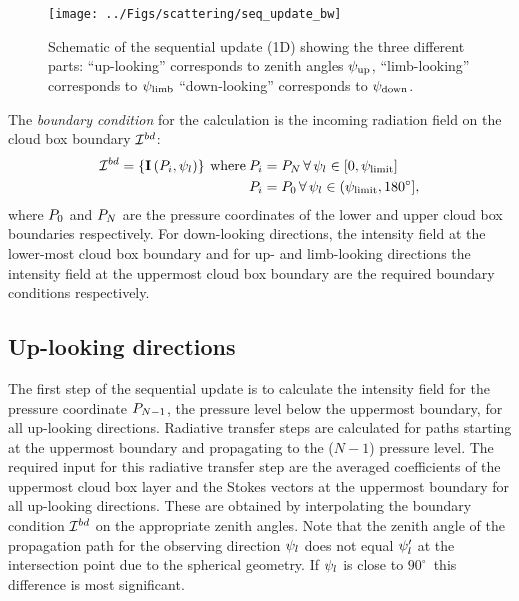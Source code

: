 \begin{figure}[htbp]
\centering
  \texttt{[image: ../Figs/scattering/seq\_update\_bw]}
 \caption{Schematic of the sequential update (1D) showing the three different parts:  ``up-looking'' corresponds to zenith angles $\psi_\mathrm{up}$, ``limb-looking'' corresponds to $\psi_\mathrm{limb}$ ``down-looking'' corresponds to $\psi_\mathrm{down}$.}
  \label{fig:scattering:seq_update}  
\end{figure}

The \emph{boundary condition} for the calculation is the incoming
radiation field on the cloud box boundary ${\mathcal I}^{bd}$:
\begin{eqnarray}
  {\mathcal I}^{bd} = \left\{{\bf I} \left( P_i,\psi_l \right) \right\}
  \: \mathrm{where}  \: & P_i = P_N \, \forall \,  \psi_l \in [0,\psi_\mathrm{limit}]  \nonumber\\
   & P_i = P_0  \, \forall \, \psi_l \in (\psi_\mathrm{limit},180^\circ],
\end{eqnarray}
where $P_0$ and $P_N$ are the pressure coordinates of the lower and
upper cloud box boundaries respectively. For down-looking directions,
the intensity field at the lower-most cloud box boundary and for up-
and limb-looking directions the intensity field at the uppermost
cloud box boundary are the required boundary conditions respectively.

\subsection{Up-looking directions}

The first step of the sequential update is to calculate the intensity
field for the pressure coordinate $P_{N-1}$, the pressure level below
the uppermost boundary, for all up-looking directions.  Radiative
transfer steps are calculated for paths starting at the uppermost
boundary and propagating to the ($N-1$) pressure level. The required
input for this radiative transfer step are the averaged coefficients
of the uppermost cloud box layer and the Stokes vectors at
the uppermost boundary for all up-looking directions. These are obtained
by interpolating the boundary condition ${\mathcal I}^{bd}$ on the
appropriate zenith angles. Note that the zenith angle of the
propagation path for the observing direction $\psi_l$ does not equal
$\psi_l'$ at the intersection point due to the spherical
geometry. If $\psi_l$ is close to $90^\circ$\ this difference is
most significant.
  
